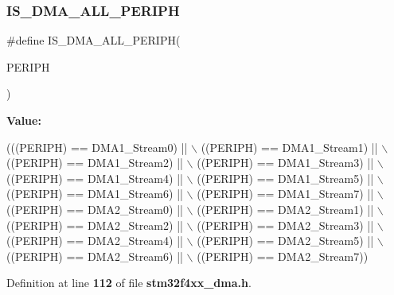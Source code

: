 \mbox{\label{group__DMA__Exported__Constants_gabcab9fa1c48b148703a8f41c1d99e0c8}} 
\subsubsection{I\+S\+\_\+\+D\+M\+A\+\_\+\+A\+L\+L\+\_\+\+P\+E\+R\+I\+PH}
{\footnotesize\ttfamily \#define I\+S\+\_\+\+D\+M\+A\+\_\+\+A\+L\+L\+\_\+\+P\+E\+R\+I\+PH(\begin{DoxyParamCaption}\item[{}]{P\+E\+R\+I\+PH }\end{DoxyParamCaption})}

{\bfseries Value\+:}
\begin{DoxyCode}
(((PERIPH) == DMA1_Stream0) || \(\backslash\)
                                   ((PERIPH) == DMA1_Stream1) || \(\backslash\)
                                   ((PERIPH) == DMA1_Stream2) || \(\backslash\)
                                   ((PERIPH) == DMA1_Stream3) || \(\backslash\)
                                   ((PERIPH) == DMA1_Stream4) || \(\backslash\)
                                   ((PERIPH) == DMA1_Stream5) || \(\backslash\)
                                   ((PERIPH) == DMA1_Stream6) || \(\backslash\)
                                   ((PERIPH) == DMA1_Stream7) || \(\backslash\)
                                   ((PERIPH) == DMA2_Stream0) || \(\backslash\)
                                   ((PERIPH) == DMA2_Stream1) || \(\backslash\)
                                   ((PERIPH) == DMA2_Stream2) || \(\backslash\)
                                   ((PERIPH) == DMA2_Stream3) || \(\backslash\)
                                   ((PERIPH) == DMA2_Stream4) || \(\backslash\)
                                   ((PERIPH) == DMA2_Stream5) || \(\backslash\)
                                   ((PERIPH) == DMA2_Stream6) || \(\backslash\)
                                   ((PERIPH) == DMA2_Stream7))
\end{DoxyCode}


Definition at line \textbf{ 112} of file \textbf{ stm32f4xx\+\_\+dma.\+h}.


